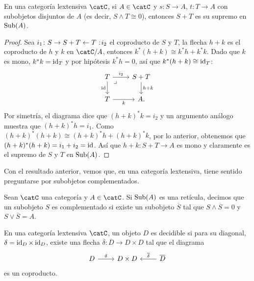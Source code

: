\begin{corollary}
  En una categoría lextensiva $\catC$, si $A\in\catC$ y $s\colon S\to A$, $t\colon T\to A$
  con subobjetos disjuntos de $A$ (es decir, $S\land T\cong 0$), entonces $S+T$ es su supremo en $\operatorname{Sub}(A)$.
\end{corollary}
\begin{proof}
  Sea $i_1\colon S\to S+T\leftarrow T\noloc i_2$ el coproducto de $S$ y $T$, la flecha $h+k$ es el coproducto de $h$ y $k$ en $\catC/A$, entonces $k^*(h+k)\cong k^*h+k^*k$.
  Dado que $k$ es mono, $k^*k=\operatorname{id}_T$ y por hipótesis $k^*h=0$, así que $k^*(h+k)\cong\operatorname{id}_T$:
  \begin{equation*}
    \begin{tikzcd}
      T\ar{r}{i_2}\ar[swap]{d}{\id}\ar[phantom, pos=0.1]{rd}{\lrcorner} & S+T\ar{d}{h+k} \\
      T\ar[swap]{r}{k} & A.
    \end{tikzcd}
  \end{equation*}
  Por simetría, el diagrama dice que $(h+k)^*k=i_2$ y un argumento análogo muestra
  que $(h+k)^*h=i_1$. Como $(h+k)^*(h+k)\cong(h+k)^*h+(h+k)^*k$, por lo anterior, obtenemos que $(h+k)^*(h+k)=i_1+i_2=\operatorname{id}$.
  Así que $h+k\colon S+T\to A$ es mono y claramente es el supremo de $S$ y $T$ en $\operatorname{Sub}(A)$.
\end{proof}

Con el resultado anterior, vemos que, en una categoría lextensiva, tiene sentido
preguntarse por subobjetos complementados.

\begin{definition}
  Sean $\catC$ una categoría y $A\in\catC$. Si $\operatorname{Sub}(A)$ es una retícula, decimos que
  un subobjeto $S$ es complementado si existe un subobjeto $\overline{S}$ tal que
  $S\land\overline{S}=0$ y $S\lor\overline{S}=A$.
\end{definition}

\begin{definition}
  En una categoría lextensiva $\catC$, un objeto $D$ es decidible si para su diagonal, 
  $\delta=\operatorname{id}_D\times\operatorname{id}_D$, existe una flecha $\overline{\delta}\colon \overline{D}\to D\times D$ 
  tal que el diagrama
  \begin{equation*}
    \begin{tikzcd}
      D\ar{r}{\delta} & D\times D & \overline{D}\ar[swap]{l}{\overline{\delta}}
    \end{tikzcd}
  \end{equation*}
  es un coproducto.
\end{definition}

